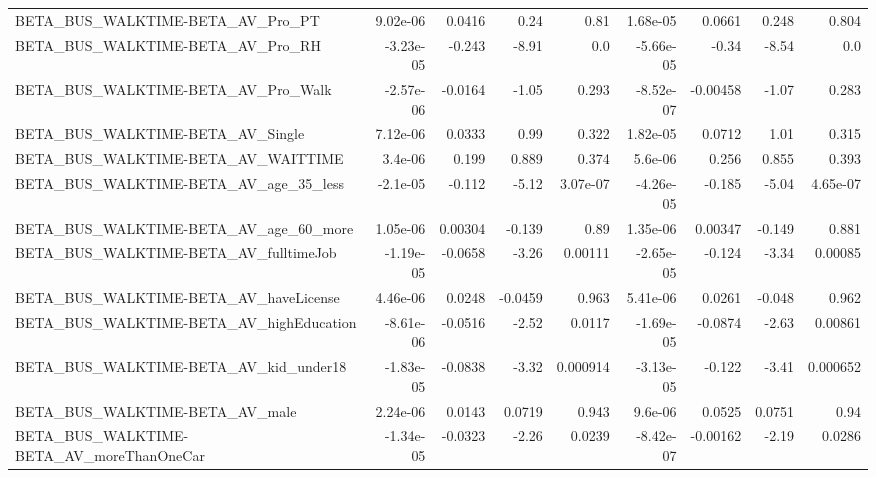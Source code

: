\begin{tabular}{lrrrrrrrr}
BETA\_BUS\_WALKTIME-BETA\_AV\_Pro\_PT                   &    9.02e-06 &       0.0416 &      0.24 &     0.81 &   1.68e-05 &      0.0661 &        0.248 &         0.804 \\
BETA\_BUS\_WALKTIME-BETA\_AV\_Pro\_RH                   &   -3.23e-05 &       -0.243 &     -8.91 &      0.0 &  -5.66e-05 &       -0.34 &        -8.54 &           0.0 \\
BETA\_BUS\_WALKTIME-BETA\_AV\_Pro\_Walk                 &   -2.57e-06 &      -0.0164 &     -1.05 &    0.293 &  -8.52e-07 &    -0.00458 &        -1.07 &         0.283 \\
BETA\_BUS\_WALKTIME-BETA\_AV\_Single                   &    7.12e-06 &       0.0333 &      0.99 &    0.322 &   1.82e-05 &      0.0712 &         1.01 &         0.315 \\
BETA\_BUS\_WALKTIME-BETA\_AV\_WAITTIME                 &     3.4e-06 &        0.199 &     0.889 &    0.374 &    5.6e-06 &       0.256 &        0.855 &         0.393 \\
BETA\_BUS\_WALKTIME-BETA\_AV\_age\_35\_less              &    -2.1e-05 &       -0.112 &     -5.12 & 3.07e-07 &  -4.26e-05 &      -0.185 &        -5.04 &      4.65e-07 \\
BETA\_BUS\_WALKTIME-BETA\_AV\_age\_60\_more              &    1.05e-06 &      0.00304 &    -0.139 &     0.89 &   1.35e-06 &     0.00347 &       -0.149 &         0.881 \\
BETA\_BUS\_WALKTIME-BETA\_AV\_fulltimeJob              &   -1.19e-05 &      -0.0658 &     -3.26 &  0.00111 &  -2.65e-05 &      -0.124 &        -3.34 &       0.00085 \\
BETA\_BUS\_WALKTIME-BETA\_AV\_haveLicense              &    4.46e-06 &       0.0248 &   -0.0459 &    0.963 &   5.41e-06 &      0.0261 &       -0.048 &         0.962 \\
BETA\_BUS\_WALKTIME-BETA\_AV\_highEducation            &   -8.61e-06 &      -0.0516 &     -2.52 &   0.0117 &  -1.69e-05 &     -0.0874 &        -2.63 &       0.00861 \\
BETA\_BUS\_WALKTIME-BETA\_AV\_kid\_under18              &   -1.83e-05 &      -0.0838 &     -3.32 & 0.000914 &  -3.13e-05 &      -0.122 &        -3.41 &      0.000652 \\
BETA\_BUS\_WALKTIME-BETA\_AV\_male                     &    2.24e-06 &       0.0143 &    0.0719 &    0.943 &    9.6e-06 &      0.0525 &       0.0751 &          0.94 \\
BETA\_BUS\_WALKTIME-BETA\_AV\_moreThanOneCar           &   -1.34e-05 &      -0.0323 &     -2.26 &   0.0239 &  -8.42e-07 &    -0.00162 &        -2.19 &        0.0286 \\

\end{tabular}
